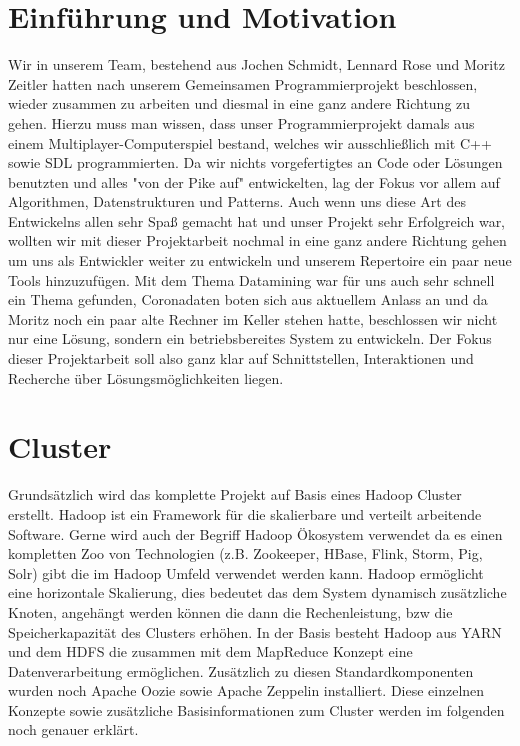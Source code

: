\documentclass[12pt,twoside,a4paper,parskip]{scrbook}
\begin{document}
\chapter{Einführung und Motivation}\label{ch:intro}
Wir in unserem Team, bestehend aus Jochen Schmidt, Lennard Rose und Moritz Zeitler hatten nach unserem Gemeinsamen Programmierprojekt beschlossen, wieder zusammen zu arbeiten und diesmal in eine ganz andere Richtung zu gehen. Hierzu muss man wissen, dass unser Programmierprojekt damals aus einem Multiplayer-Computerspiel bestand, welches wir ausschließlich mit C++ sowie SDL programmierten. Da wir nichts vorgefertigtes an Code oder Lösungen benutzten und alles "von der Pike auf"  entwickelten, lag der Fokus vor allem auf Algorithmen, Datenstrukturen und Patterns. Auch wenn uns diese Art des Entwickelns allen sehr Spaß gemacht hat und unser Projekt sehr Erfolgreich war, wollten wir mit dieser Projektarbeit nochmal in eine ganz andere Richtung gehen um uns als Entwickler weiter zu entwickeln und unserem Repertoire ein paar neue Tools hinzuzufügen. Mit dem Thema Datamining war für uns auch sehr schnell ein Thema gefunden, Coronadaten boten sich aus aktuellem Anlass an und da Moritz noch ein paar alte Rechner im Keller stehen hatte, beschlossen wir nicht nur eine Lösung, sondern ein betriebsbereites System zu entwickeln. \newline
Der Fokus dieser Projektarbeit soll also ganz klar auf Schnittstellen, Interaktionen und Recherche über Lösungsmöglichkeiten liegen. 


\chapter{Cluster}
Grunds\"atzlich wird das komplette Projekt auf Basis eines Hadoop Cluster erstellt. Hadoop ist ein Framework f\"ur die skalierbare und verteilt arbeitende Software. Gerne wird auch der Begriff  Hadoop \"Okosystem verwendet da es einen kompletten Zoo von Technologien (z.B. Zookeeper, HBase, Flink, Storm, Pig, Solr) gibt die im Hadoop Umfeld verwendet werden kann. Hadoop erm\"oglicht eine horizontale Skalierung, dies bedeutet das dem System dynamisch zus\"atzliche Knoten, angeh\"angt werden k\"onnen die dann die Rechenleistung, bzw die Speicherkapazit\"at des Clusters erh\"ohen. In der Basis besteht Hadoop aus YARN und dem HDFS die zusammen mit dem MapReduce Konzept eine Datenverarbeitung erm\"oglichen. Zus\"atzlich zu diesen Standardkomponenten wurden noch Apache Oozie sowie Apache Zeppelin installiert. Diese einzelnen Konzepte sowie zus\"atzliche Basisinformationen zum Cluster werden im folgenden noch genauer erkl\"art.
\end{document}
